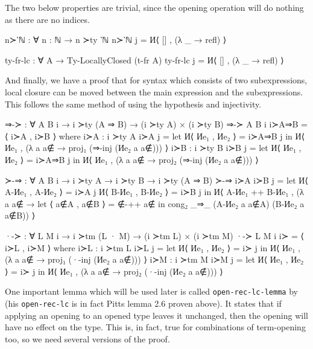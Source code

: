 \documentclass[logo,bsc,singlespacing,parskip,online]{infthesis}
\begin{document}
The two below properties are trivial, since the opening operation will do nothing as there are no
indices.
\begin{code}
  n≻‵ℕ : ∀ {n : ℕ} → n ≻ty ‵ℕ
  n≻‵ℕ j = И⟨ [] , (λ _ → refl) ⟩

  ty-fr-lc : ∀ {A} → Ty-LocallyClosed (t-fr A)
  ty-fr-lc j = И⟨ [] , (λ _ → refl) ⟩
\end{code}

And finally, we have a proof that for syntax which consists of two subexpressions, local closure can
be moved between the main expression and the subexpressions. This follows the same method of using
the hypothesis and injectivity.
\begin{code}
  ⇒-≻ : ∀ {A B i} → i ≻ty (A ⇒ B) → (i ≻ty A) × (i ≻ty B)
  ⇒-≻ {A} {B} {i} i≻A⇒B = ⟨ i≻A , i≻B ⟩
    where
      i≻A : i ≻ty A
      i≻A j = let И⟨ Иe₁ , Иe₂ ⟩ = i≻A⇒B j
        in И⟨ Иe₁ , (λ a {a∉} → proj₁ (⇒-inj (Иe₂ a {a∉}))) ⟩
      i≻B : i ≻ty B
      i≻B j = let И⟨ Иe₁ , Иe₂ ⟩ = i≻A⇒B j
        in И⟨ Иe₁ , (λ a {a∉} → proj₂ (⇒-inj (Иe₂ a {a∉}))) ⟩

  ≻-⇒ : ∀ {A B i} → i ≻ty A → i ≻ty B → i ≻ty (A ⇒ B)
  ≻-⇒ i≻A i≻B j =
    let И⟨ A-Иe₁ , A-Иe₂ ⟩ = i≻A j
        И⟨ B-Иe₁ , B-Иe₂ ⟩ = i≻B j
    in И⟨ A-Иe₁ ++ B-Иe₁ , (λ a {a∉} →
      let ⟨ a∉A , a∉B ⟩ = ∉-++ a∉
      in cong₂ _⇒_ (A-Иe₂ a {a∉A}) (B-Иe₂ a {a∉B})) ⟩

  ·-≻ : ∀ {L M i} → i ≻tm (L · M) → (i ≻tm L) × (i ≻tm M)
  ·-≻ {L} {M} {i} i≻ = ⟨ i≻L , i≻M ⟩
    where
      i≻L : i ≻tm L
      i≻L j = let И⟨ Иe₁ , Иe₂ ⟩ = i≻ j
        in И⟨ Иe₁ , (λ a {a∉} → proj₁ (·-inj (Иe₂ a {a∉}))) ⟩
      i≻M : i ≻tm M
      i≻M j = let И⟨ Иe₁ , Иe₂ ⟩ = i≻ j
        in И⟨ Иe₁ , (λ a {a∉} → proj₂ (·-inj (Иe₂ a {a∉}))) ⟩
\end{code}

One important lemma which will be used later is called \texttt{open-rec-lc-lemma} by
\citet{chargueraud_locally_2012} (his \texttt{open-rec-lc} is in fact Pitts lemma 2.6 proven above).
It states that if applying an opening to an opened type leaves it unchanged, then the opening will
have no effect on the type. This is, in fact, true for combinations of term-opening too, so we need
several versions of the proof.
\end{document}
